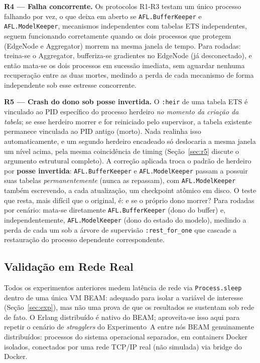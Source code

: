 \documentclass[conference,a4paper]{IEEEtran}
\begin{document}
\textbf{R4 --- Falha concorrente.} Os protocolos R1-R3 testam um único
processo falhando por vez, o que deixa em aberto se
\texttt{AFL.BufferKeeper} e \texttt{AFL.ModelKeeper}, mecanismos
independentes com tabelas ETS independentes, seguem funcionando
corretamente quando os dois processos que protegem (EdgeNode e Aggregator)
morrem na mesma janela de tempo. Para \statExpRFourTrials{} rodadas:
treina-se o Aggregator, bufferiza-se gradientes no EdgeNode (já
desconectado), e então mata-se os dois processos em sucessão imediata, sem
aguardar nenhuma recuperação entre as duas mortes, medindo a perda de
cada mecanismo de forma independente sob esse estresse concorrente.

\textbf{R5 --- Crash do dono sob posse invertida.} O \texttt{:heir} de uma
tabela ETS é vinculado ao PID específico do processo herdeiro
\emph{no momento da criação da tabela}; se esse herdeiro morrer e for
reiniciado pelo supervisor, a tabela existente permanece vinculada ao PID
antigo (morto). Nada realinha isso automaticamente, e um segundo
herdeiro encadeado só deslocaria a mesma janela um nível acima, pela
mesma coincidência de timing (Seção~\ref{sec:r5} discute o argumento
estrutural completo). A correção aplicada troca o padrão de
herdeiro por \textbf{posse invertida}: \texttt{AFL.BufferKeeper} e
\texttt{AFL.ModelKeeper} passam a possuir suas tabelas
\emph{permanentemente} (nunca as repassam), com \texttt{AFL.ModelKeeper}
também escrevendo, a cada atualização, um checkpoint atômico em disco.
O teste que resta, mais difícil que o original, é: e se o próprio dono
morrer? Para \statExpRFiveTrials{} rodadas por cenário: mata-se
diretamente \texttt{AFL.BufferKeeper} (dono do buffer) e,
independentemente, \texttt{AFL.ModelKeeper} (dono do estado do modelo),
medindo a perda de cada um sob a árvore de supervisão
\texttt{:rest\_for\_one} que cascade a restauração do processo
dependente correspondente.

\subsection{Validação em Rede Real}
\label{sec:exp_dist}

Todos os experimentos anteriores medem latência de rede via
\texttt{Process.sleep} dentro de uma única VM BEAM: adequado para
isolar a variável de interesse (Seção~\ref{sec:exp}), mas não uma prova de
que os resultados se sustentam sob rede de fato. O Erlang distribuído é
nativo do BEAM; aproveita-se isso aqui para repetir o cenário de
\textit{stragglers} do Experimento~A entre nós BEAM genuinamente
distribuídos: processos do sistema operacional separados, em
containers Docker isolados, conectados por uma rede TCP/IP real (não
simulada) via bridge do Docker.
\end{document}
